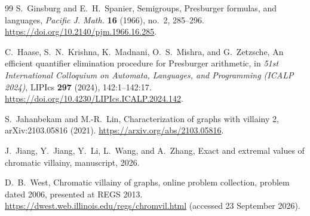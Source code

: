 \documentclass[10pt,a4paper]{amsart}
\numberwithin{equation}{section}
\theoremstyle{definition}
\theoremstyle{remark}
\begin{document}
\begin{thebibliography}{99}
S.~Ginsburg and E.~H.~Spanier,
Semigroups, Presburger formulas, and languages,
\emph{Pacific J. Math.} \textbf{16} (1966), no.~2, 285--296.
\url{https://doi.org/10.2140/pjm.1966.16.285}.

C.~Haase, S.~N.~Krishna, K.~Madnani, O.~S.~Mishra, and G.~Zetzsche,
An efficient quantifier elimination procedure for Presburger arithmetic,
in \emph{51st International Colloquium on Automata, Languages, and
Programming (ICALP 2024)}, LIPIcs \textbf{297} (2024), 142:1--142:17.
\url{https://doi.org/10.4230/LIPIcs.ICALP.2024.142}.

S.~Jahanbekam and M.-R.~Lin,
Characterization of graphs with villainy 2,
arXiv:2103.05816 (2021).
\url{https://arxiv.org/abs/2103.05816}.

J.~Jiang, Y.~Jiang, Y.~Li, L.~Wang, and A.~Zhang,
Exact and extremal values of chromatic villainy,
manuscript, 2026.

D.~B.~West,
Chromatic villainy of graphs,
online problem collection, problem dated 2006, presented at REGS 2013.
\url{https://dwest.web.illinois.edu/regs/chromvil.html}
(accessed 23 September 2026).

\end{thebibliography}
\end{document}
